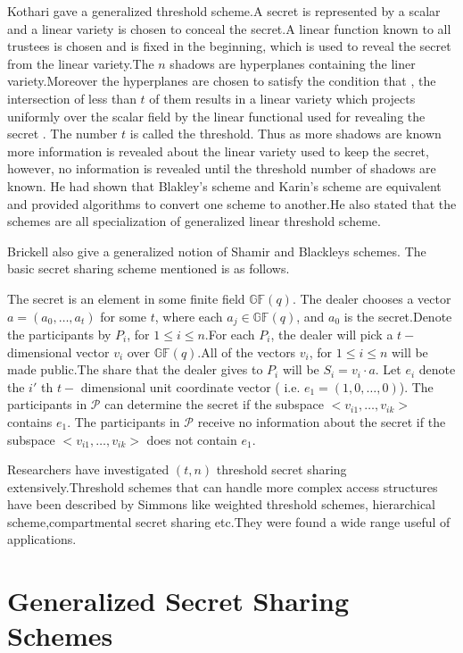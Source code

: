 \documentclass{llncs}
\begin{document}
Kothari \cite{kothari1985generalized} gave a generalized threshold scheme.A secret is represented by a scalar and a linear variety is chosen to conceal the secret.A linear function known to all trustees is chosen and is fixed in the beginning, which is used to reveal the secret from the linear variety.The $n$ shadows are hyperplanes containing the liner variety.Moreover the hyperplanes are chosen to satisfy the condition that , the intersection of less than $t$ of them results in a linear variety which projects uniformly over the scalar field by the linear functional used for revealing the secret . The number $t$ is called the threshold. Thus as more shadows are known more information is revealed about the linear variety used to keep the secret, however, no information is revealed until the threshold number of shadows are known.
He had shown that Blakley's scheme and Karin's scheme are equivalent and provided algorithms to convert one scheme to another.He also stated that the schemes are all specialization of generalized linear threshold scheme.

Brickell\cite{brickell1989some} also give a generalized notion of Shamir and Blackleys schemes. The basic secret sharing scheme mentioned is as follows.
 
The secret is an element in some finite field $\mathbb{GF}(q)$. The dealer chooses a vector $a=(a_{0},\ldots,a_{t})$ for some $t$, where each $a_{j} \in  \mathbb{GF}(q)$, and $a_{0}$ is the secret.Denote the participants by $P_{i}$, for $1 \le i \le n$.For each $P_{i}$, the dealer will pick a $t-$dimensional vector $v_{i}$ over $ \mathbb{GF}(q)$.All of the vectors $v_{i}$, for $1 \le i \le n$ will be made public.The share that the dealer gives to $P_{i}$ will be $S_{i}=v_{i}\cdot a$. Let $e_{i}$ denote the $i'$ th $t-$ dimensional unit coordinate vector ( i.e. $ e_{1}=(1,0,\ldots,0)$). 
The participants in $\mathcal{P}$ can determine the secret if the subspace  $<v_{i1},\ldots,v_{ik}>$ contains $e_{1}$.
The participants in $\mathcal{P}$ receive no information about the secret if the subspace $<v_{i1},\ldots,v_{ik}>$ does not contain $e_{1}$.

Researchers have investigated $(t, n)$ threshold secret sharing extensively.Threshold schemes that can handle more complex access structures have been described by Simmons \cite{simmons1992} like weighted threshold schemes, hierarchical scheme,compartmental secret sharing etc.They were found a wide range useful of applications.

\section{Generalized Secret Sharing Schemes}
\end{document}
